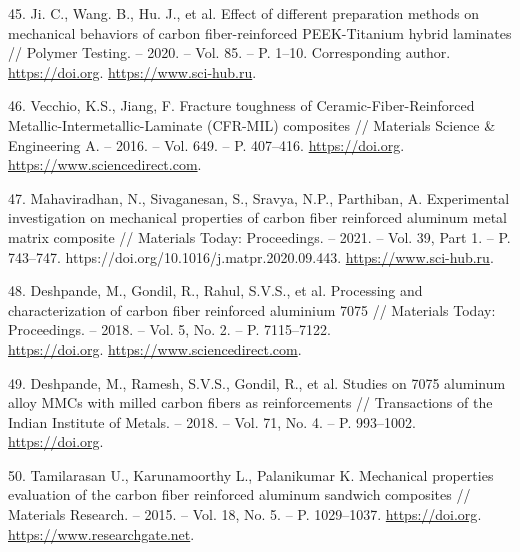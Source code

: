 \begin{references}
45. Ji. C., Wang. B., Hu. J., et al. Effect of different preparation
methods on mechanical behaviors of carbon fiber-reinforced
PEEK-Titanium hybrid laminates // Polymer Testing. – 2020. –
Vol. 85. – P. 1–10. Corresponding
author. \href{https://doi.org/10.1016/j.polymertesting.2020.106462}{https://doi.org}. \href{https://www.sci-hub.ru/10.1016/j.polymertesting.2020.106462?ysclid=m839czkw50582004401}{https://www.sci-hub.ru}.

46. Vecchio, K.S., Jiang, F. Fracture toughness of
Ceramic-Fiber-Reinforced Metallic-Intermetallic-Lami\-nate (CFR-MIL)
composites // Materials Science \& Engineering A. – 2016. –
Vol. 649. –
P. 407–416. \href{https://doi.org/10.1016/j.msea.2015.10.018}{https://doi.org}. \href{https://www.sciencedirect.com/science/article/abs/pii/S0921509315304822?via\%3Dihub}{https://www.sciencedirect.com}.

47. Mahaviradhan, N., Sivaganesan, S., Sravya, N.P., Parthiban,
A. Experimental investigation on mechan\-ical properties of carbon fiber
reinforced aluminum metal matrix composite // Materials Today:
Proceed\-ings. – 2021. – Vol. 39, Part 1. –
P. 743–747. https://doi.org/10.1016/j.matpr.2020.09.443. \href{https://www.sci-hub.ru/10.1016/j.matpr.2020.09.443?ysclid=m839ktt5c4169456263}{https://www.sci-hub.ru}.

48. Deshpande, M., Gondil, R., Rahul, S.V.S., et al. Processing and
characterization of carbon fiber reinfor\-ced aluminium 7075 //
Materials Today: Proceedings. – 2018. – Vol. 5, No. 2. –
P. 7115–7122. \\\href{https://doi.org/10.1016/j.matpr.2017.11.376}{https://doi.org}. \href{https://www.sciencedirect.com/science/article/abs/pii/S2214785317326445?via\%3Dihub}{https://www.sciencedirect.com}.

49. Deshpande, M., Ramesh, S.V.S., Gondil, R., et al. Studies on 7075
aluminum alloy MMCs with milled carbon fibers as reinforcements //
Transactions of the Indian Institute of Metals. – 2018. – Vol. 71,
No. 4. –
P. 993–1002. \href{https://doi.org/10.1007/s12666-017-1233-4}{https://doi.org}.

50. Tamilarasan U., Karunamoorthy L., Palanikumar K. Mechanical
properties evaluation of the carbon fiber reinforced aluminum sandwich
composites // Materials Research. – 2015. – Vol. 18, No. 5. –
P. 1029–1037. \href{https://doi.org/10.1590/1516-1439.017215}{https://doi.org}. \href{https://www.researchgate.net/publication/283618484_Mechanical_Properties_Evaluation_of_the_Carbon_Fibre_Reinforced_Aluminium_Sandwich_Composites}{https://www.researchgate.net}.


\end{references}
